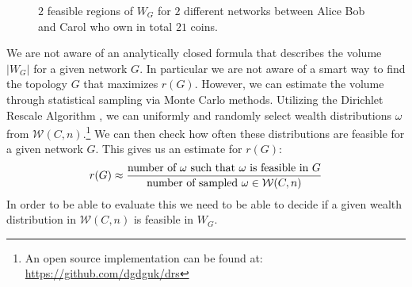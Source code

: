 \documentclass[10pt,twocolumn]{article}
\begin{document}
\begin{figure}[h]
  \centering
  \caption{$2$ feasible regions of $W_G$ for $2$ different networks between Alice Bob and Carol who own in total $21$ coins.}
  \label{fig:feasibleLNWealthPolytopes}
\end{figure}


We are not aware of an analytically closed formula that describes the volume \( |W_G| \) for a given network \( G \).
In particular we are not aware of a smart way to find the topology $G$ that maximizes $r(G)$.
However, we can estimate the volume through statistical sampling via Monte Carlo methods. Utilizing the Dirichlet Rescale Algorithm \cite{griffin2020generating}, we can uniformly and randomly select wealth distributions \( \omega \) from \( \mathcal{W}(C,n) \).\footnote{An open source implementation can be found at: \url{https://github.com/dgdguk/drs}} We can then check how often these distributions are feasible for a given network \( G \). This gives us an estimate for \( r(G) \):
\begin{equation}
r(G) \approx \frac{\text{number of \( \omega \) such that \( \omega \) is feasible in \( G \)}}{\text{number of sampled \( \omega \in \mathcal{W}(C,n) \)}}
\end{equation}
In order to be able to evaluate this we need to be able to decide if a given wealth distribution in $\mathcal{W}(C,n)$ is feasible in $W_G$.
\end{document}

